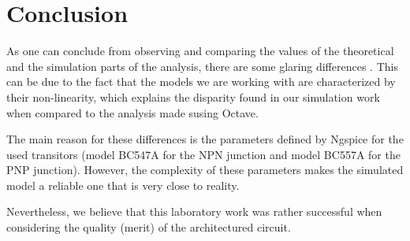\section{Conclusion}
\label{sec:conclusion}

As one can conclude from observing and comparing the values of the theoretical and the simulation parts of the analysis, there are some glaring differences . This can be due to the fact that the models we are working with are characterized by their non-linearity, which explains the disparity found in our simulation work when compared to the analysis made susing Octave. 

The main reason for these differences is the parameters defined by Ngspice for the used transitors (model BC547A for the NPN junction and model BC557A for the PNP junction). However, the complexity of these parameters makes the simulated model a reliable one that is very close to reality.

Nevertheless, we believe that this laboratory work was rather successful when considering the quality (merit) of the architectured circuit.

